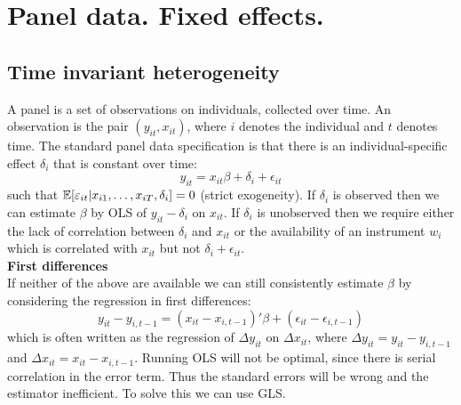 \documentclass[DIV=14,titlepage=false]{scrreprt}
\begin{document}
\vspace{-10pt}
\setcounter{chapter}{16}

\chapter{Panel data. Fixed effects.}
\section{Time invariant heterogeneity}
A panel is a set of observations on individuals, collected over time. An observation is the pair $(y_{it},x_{it})$, where $i$ denotes the individual and $t$ denotes time. The standard panel data specification is that there is an individual-specific effect $\delta_i$ that is constant over time:\[y_{it}=x_{it}\beta+\delta_i+\epsilon_{it}\] such that $\mathbb{E}[\varepsilon_{it}|x_{i1},\dots,x_{iT},\delta_i]=0$ (strict exogeneity). If $\delta_i$ is observed then we can estimate $\beta$ by OLS of $y_{it}-\delta_i$ on $x_{it}$. If $\delta_i$  is unobserved then we require either the lack of correlation between $\delta_i$ and $x_{it}$ or the availability of an instrument $w_i$ which is correlated with $x_{it}$ but not $\delta_i+\epsilon_{it}$.\\
\textbf{First differences}\\
If neither of the above are available we can still consistently estimate $\beta$ by considering the regression in first differences:\begin{equation} y_{it}-y_{i,t-1}=(x_{it}-x_{i,t-1})'\beta+(\epsilon_{it}-\epsilon_{i,t-1})\end{equation} which is often written as the regression of $\Delta y_{it}$ on $\Delta x_{it}$, where $\Delta y_{it}=y_{it}-y_{i,t-1}$ and $\Delta x_{it}=x_{it}-x_{i,t-1}$. Running OLS will not be optimal, since there is serial correlation in the error term. Thus the standard errors will be wrong and the estimator inefficient. To solve this we can use GLS.
\end{document}
